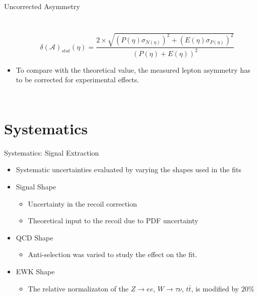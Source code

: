 \documentclass[8pt]{beamer}
\begin{document}
\begin{frame}{Uncorrected Asymmetry}
\begin{columns}[c]
\begin{itemize}
  \tiny{
  \begin{equation}
    \delta(\mathcal{A})_{stat}(\eta) = 
    \frac{2 \times \sqrt{ \left( P(\eta) \sigma_{N(\eta)}\right) ^2 + \left( E(\eta) \sigma_{P (\eta)}\right)^2}}{\left(  P(\eta) +  E(\eta) \right)^{2} }
  \end{equation}
  }
  \normalsize

    \item To compare with the theoretical value, the measured lepton asymmetry
    has to be corrected for experimental effects.
  \end{itemize}
  \end{columns}
\end{frame}


\section{Systematics}

\begin{frame}{Systematics: Signal Extraction}
  \begin{itemize}
    \item Systematic uncertainties evaluated by varying the shapes used in the fits
    \item Signal Shape
    \begin{itemize}
      \item Uncertainty in the recoil correction
      \item Theoretical input to the recoil due to PDF uncertainty
    \end{itemize}
    \item QCD Shape
    \begin{itemize}
      \item Anti-selection was varied to study the effect on the fit. 
    \end{itemize}
    \item EWK Shape
    \begin{itemize}
      \item The relative normalizaton of the $Z \to ee$, $W \to \tau\nu$,
      $t\bar{t}$, is modified by $20\%$
    \end{itemize}
 \end{itemize}
\end{frame}
\end{document}
